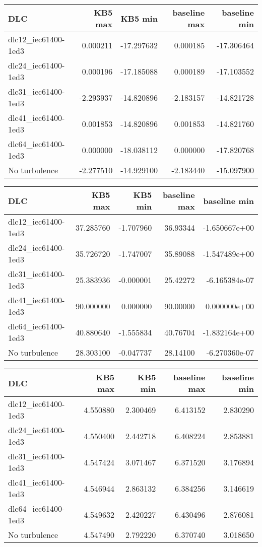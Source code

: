 \begin{tabular}{lrrrr}
\toprule
                 DLC &    KB5 max &    KB5 min &  baseline max &  baseline min \\
\midrule
 dlc12\_iec61400-1ed3 &  0.000211 & -17.297632 &      0.000185 &    -17.306464 \\
 dlc24\_iec61400-1ed3 &  0.000196 & -17.185088 &      0.000189 &    -17.103552 \\
 dlc31\_iec61400-1ed3 & -2.293937 & -14.820896 &     -2.183157 &    -14.821728 \\
 dlc41\_iec61400-1ed3 &  0.001853 & -14.820896 &      0.001853 &    -14.821760 \\
 dlc64\_iec61400-1ed3 &  0.000000 & -18.038112 &      0.000000 &    -17.820768 \\
        No turbulence & -2.277510 & -14.929100 &     -2.183440 &    -15.097900 \\
\bottomrule
\end{tabular}


\clearpage


\begin{tabular}{lrrrr}
\toprule
                 DLC &    KB5 max &   KB5 min &  baseline max &  baseline min \\
\midrule
 dlc12\_iec61400-1ed3 &  37.285760 & -1.707960 &      36.93344 & -1.650667e+00 \\
 dlc24\_iec61400-1ed3 &  35.726720 & -1.747007 &      35.89088 & -1.547489e+00 \\
 dlc31\_iec61400-1ed3 &  25.383936 & -0.000001 &      25.42272 & -6.165384e-07 \\
 dlc41\_iec61400-1ed3 &  90.000000 &  0.000000 &      90.00000 &  0.000000e+00 \\
 dlc64\_iec61400-1ed3 &  40.880640 & -1.555834 &      40.76704 & -1.832164e+00 \\
        No turbulence &  28.303100 & -0.047737 &      28.14100 & -6.270360e-07 \\
\bottomrule
\end{tabular}


\begin{tabular}{lrrrr}
\toprule
                 DLC &   KB5 max &   KB5 min &  baseline max &  baseline min \\
\midrule
 dlc12\_iec61400-1ed3 &  4.550880 &  2.300469 &      6.413152 &      2.830290 \\
 dlc24\_iec61400-1ed3 &  4.550400 &  2.442718 &      6.408224 &      2.853881 \\
 dlc31\_iec61400-1ed3 &  4.547424 &  3.071467 &      6.371520 &      3.176894 \\
 dlc41\_iec61400-1ed3 &  4.546944 &  2.863132 &      6.384256 &      3.146619 \\
 dlc64\_iec61400-1ed3 &  4.549632 &  2.420227 &      6.430496 &      2.876081 \\
        No turbulence &  4.547490 &  2.792220 &      6.370740 &      3.018650 \\
\bottomrule
\end{tabular}


